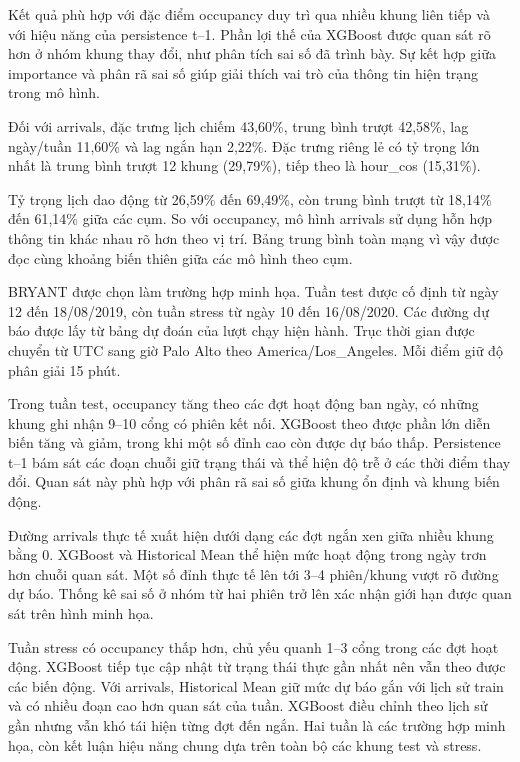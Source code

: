 \documentclass[conference,a4paper]{IEEEtran}
\begin{document}
Kết quả phù hợp với đặc điểm occupancy duy trì qua nhiều khung liên tiếp và với hiệu năng của persistence t–1. Phần lợi thế của XGBoost được quan sát rõ hơn ở nhóm khung thay đổi, như phân tích sai số đã trình bày. Sự kết hợp giữa importance và phân rã sai số giúp giải thích vai trò của thông tin hiện trạng trong mô hình.

Đối với arrivals, đặc trưng lịch chiếm 43,60\%, trung bình trượt 42,58\%, lag ngày/tuần 11,60\% và lag ngắn hạn 2,22\%. Đặc trưng riêng lẻ có tỷ trọng lớn nhất là trung bình trượt 12 khung (29,79\%), tiếp theo là hour\_cos (15,31\%).

Tỷ trọng lịch dao động từ 26,59\% đến 69,49\%, còn trung bình trượt từ 18,14\% đến 61,14\% giữa các cụm. So với occupancy, mô hình arrivals sử dụng hỗn hợp thông tin khác nhau rõ hơn theo vị trí. Bảng trung bình toàn mạng vì vậy được đọc cùng khoảng biến thiên giữa các mô hình theo cụm.

BRYANT được chọn làm trường hợp minh họa. Tuần test được cố định từ ngày 12 đến 18/08/2019, còn tuần stress từ ngày 10 đến 16/08/2020. Các đường dự báo được lấy từ bảng dự đoán của lượt chạy hiện hành. Trục thời gian được chuyển từ UTC sang giờ Palo Alto theo America/Los\_Angeles. Mỗi điểm giữ độ phân giải 15 phút.

Trong tuần test, occupancy tăng theo các đợt hoạt động ban ngày, có những khung ghi nhận 9–10 cổng có phiên kết nối. XGBoost theo được phần lớn diễn biến tăng và giảm, trong khi một số đỉnh cao còn được dự báo thấp. Persistence t–1 bám sát các đoạn chuỗi giữ trạng thái và thể hiện độ trễ ở các thời điểm thay đổi. Quan sát này phù hợp với phân rã sai số giữa khung ổn định và khung biến động.

Đường arrivals thực tế xuất hiện dưới dạng các đợt ngắn xen giữa nhiều khung bằng 0. XGBoost và Historical Mean thể hiện mức hoạt động trong ngày trơn hơn chuỗi quan sát. Một số đỉnh thực tế lên tới 3–4 phiên/khung vượt rõ đường dự báo. Thống kê sai số ở nhóm từ hai phiên trở lên xác nhận giới hạn được quan sát trên hình minh họa.

Tuần stress có occupancy thấp hơn, chủ yếu quanh 1–3 cổng trong các đợt hoạt động. XGBoost tiếp tục cập nhật từ trạng thái thực gần nhất nên vẫn theo được các biến động. Với arrivals, Historical Mean giữ mức dự báo gắn với lịch sử train và có nhiều đoạn cao hơn quan sát của tuần. XGBoost điều chỉnh theo lịch sử gần nhưng vẫn khó tái hiện từng đợt đến ngắn. Hai tuần là các trường hợp minh họa, còn kết luận hiệu năng chung dựa trên toàn bộ các khung test và stress.
\end{document}
